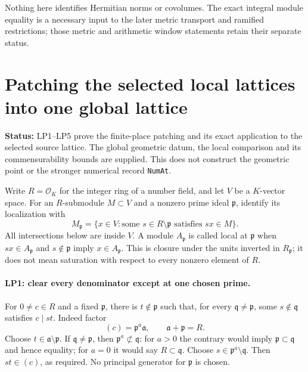 \documentclass[11pt,a4paper]{article}
\numberwithin{equation}{section}
\theoremstyle{remark}\newtheorem{remark}[theorem]{Remark}
\newcommand{\status}[1]{\textbf{Status:} #1}
\begin{document}
Nothing here identifies Hermitian norms or covolumes. The exact
integral module equality is a necessary input to the later metric
transport and ramified restrictions; those metric and arithmetic
window statements retain their separate status.


\section{Patching the selected local lattices into one global lattice}
\label{sec:lattice-patching}

\status{LP1--LP5 prove the finite-place patching and its exact application
to the selected source lattice. The global geometric datum, the local
comparison and its commensurability bounds are supplied. This does not
construct the geometric point or the stronger numerical record
\texttt{NumAt}.}

Write $R=\mathcal O_K$ for the integer ring of a number field, and let
$V$ be a $K$-vector space. For an $R$-submodule $M\subset V$ and a
nonzero prime ideal $\mathfrak p$, identify its localization with
\[
 M_{\mathfrak p}=\{x\in V:\text{some }s\in R\setminus\mathfrak p
                                      \text{ satisfies }sx\in M\}.
\]
All intersections below are inside $V$. A module $A_{\mathfrak p}$ is
called local at $\mathfrak p$ when $sx\in A_{\mathfrak p}$ and
$s\notin\mathfrak p$ imply $x\in A_{\mathfrak p}$. This is closure
under the units inverted in $R_{\mathfrak p}$; it does not mean
saturation with respect to every nonzero element of $R$.

\paragraph{LP1: clear every denominator except at one chosen prime.}
For $0\ne c\in R$ and a fixed $\mathfrak p$, there is
$t\notin\mathfrak p$ such that, for every $\mathfrak q\ne\mathfrak p$,
some $s\notin\mathfrak q$ satisfies $c\mid st$.
Indeed factor
\[
                 (c)=\mathfrak p^a\mathfrak a,
                 \qquad\mathfrak a+\mathfrak p=R.
\]
Choose $t\in\mathfrak a\setminus\mathfrak p$. If
$\mathfrak q\ne\mathfrak p$, then
$\mathfrak p^a\not\subset\mathfrak q$: for $a>0$ the contrary
would imply $\mathfrak p\subset\mathfrak q$ and hence equality;
for $a=0$ it would say $R\subset\mathfrak q$.
Choose $s\in\mathfrak p^a\setminus\mathfrak q$. Then
$st\in(c)$, as required. No principal generator for
$\mathfrak p$ is chosen.
\end{document}
